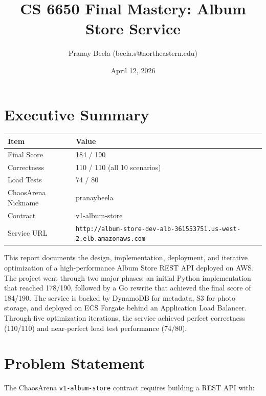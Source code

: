 \documentclass[11pt]{article}
\title{CS 6650 Final Mastery: Album Store Service}
\author{Pranay Beela (beela.s@northeastern.edu)}
\date{April 12, 2026}
\begin{document}
\maketitle

\tableofcontents
\newpage

\section{Executive Summary}

\begin{table}[H]
\centering
\begin{tabular}{ll}
\toprule
\textbf{Item} & \textbf{Value} \\
\midrule
Final Score & 184 / 190 \\
Correctness & 110 / 110 (all 10 scenarios) \\
Load Tests & 74 / 80 \\
ChaosArena Nickname & pranaybeela \\
Contract & v1-album-store \\
Service URL & \texttt{http://album-store-dev-alb-361553751.us-west-2.elb.amazonaws.com} \\
\bottomrule
\end{tabular}
\end{table}

This report documents the design, implementation, deployment, and iterative optimization of a
high-performance Album Store REST API deployed on AWS. The project went through two major
phases: an initial Python implementation that reached 178/190, followed by a Go rewrite that
achieved the final score of 184/190. The service is backed by DynamoDB for metadata, S3 for
photo storage, and deployed on ECS Fargate behind an Application Load Balancer. Through five
optimization iterations, the service achieved perfect correctness (110/110) and near-perfect load
test performance (74/80).

\section{Problem Statement}

The ChaosArena \texttt{v1-album-store} contract requires building a REST API with:
\end{document}
